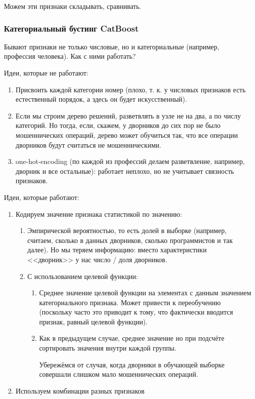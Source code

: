 \documentclass[main.tex]{subfiles}
\begin{document}
Можем эти признаки складывать, сравнивать.

\subsubsection{Категориальный бустинг CatBoost}

Бывают признаки не только числовые, но и категориальные (например, профессия человека).
Как с ними работать?

Идеи, которые не работают:
\begin{enumerate}[noitemsep]
	\item Присвоить каждой категории номер (плохо, т. к. у числовых признаков есть естественный порядок, а здесь он будет искусственный).
	\item Если мы строим дерево решений, разветвлять в узле не на два, а по числу категорий. Но тогда, если, скажем, у дворников до сих пор не было мошеннических операций, дерево может обучиться так, что все операции дворников будут считаться не мошенническими.
	\item one-hot-encoding (по каждой из профессий делаем разветвление, например, дворник и все остальные): работает неплохо, но не учитывает связность признаков. 
\end{enumerate}
 
Идеи, которые работают:

\begin{enumerate}[noitemsep]
	\item Кодируем значение признака статистикой по значению:
	\begin{enumerate}[noitemsep]
		\item Эмпирической вероятностью, то есть долей в выборке (например, считаем, сколько в данных дворников, сколько программистов и так далее).
		Но мы теряем информацию: вместо характеристики <<дворник>> у нас число / доля дворников.
		\item С использованием целевой функции:
		\begin{enumerate}[noitemsep]
			\item Среднее значение целевой функции на элементах с данным значением категориального признака. Может привести к переобучению (поскольку часто это приводит к тому, что фактически вводится признак, равный целевой функции).
			\item Как в предыдущем случае, среднее значение но при подсчёте сортировать значения внутри каждой группы.
			
			Убережёмся от случая, когда дворники в обучающей выборке совершали слишком мало мошеннических операций.
		\end{enumerate} 
	\end{enumerate}
 \item Используем комбинации разных признаков
\end{enumerate}
\end{document}
